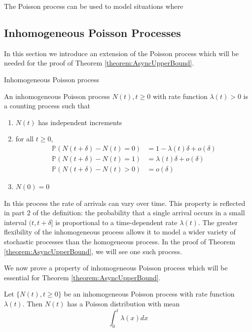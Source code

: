 The Poisson process can be used to model situations where %


\subsection{Inhomogeneous Poisson Processes}

In this section we introduce an extension of the Poisson process which will be needed for the proof of Theorem \ref{theorem:AsyncUpperBound}.

\begin{definition}
	Inhomogeneous Poisson process

	\noindent
	An inhomogeneous Poisson process ${N(t), t \geq 0}$ with rate function $\lambda(t) > 0$ is a counting process such that
	\begin{enumerate}
		\item $N(t)$ has independent increments
		\item for all $t \geq 0$, 
		\begin{align*}
			\mathbb{P}(N(t + \delta) - N(t) = 0) &= 1 - \lambda(t)\delta + o(\delta) \\
			\mathbb{P}(N(t + \delta) - N(t) = 1) &= \lambda(t)\delta + o(\delta) \\
			\mathbb{P}(N(t + \delta) - N(t) > 0) &= o(\delta)
		\end{align*}
		\item $N(0) = 0$
	\end{enumerate}
\end{definition}

In this process the rate of arrivals can vary over time. This property is reflected in part 2 of the definition: the probability that a single arrival occurs in a small interval $(t, t+\delta]$ is proportional to a time-dependent rate $\lambda(t)$. The greater flexibility of the inhomogeneous process allows it to model a wider variety of stochastic processes than the homogeneous process. In the proof of Theorem \ref{theorem:AsyncUpperBound}, we will see one such process.

We now prove a property of inhomogeneous Poisson process which will be essential for Theorem \ref{theorem:AsyncUpperBound}. 

\begin{theorem}
	Let $\{N(t), t \geq 0\}$ be an inhomogeneous Poisson process with rate function $\lambda(t)$. Then $N(t)$ has a Poisson distribution with mean
	$$
		\int_0^t \lambda(x) dx
	$$
\end{theorem}

